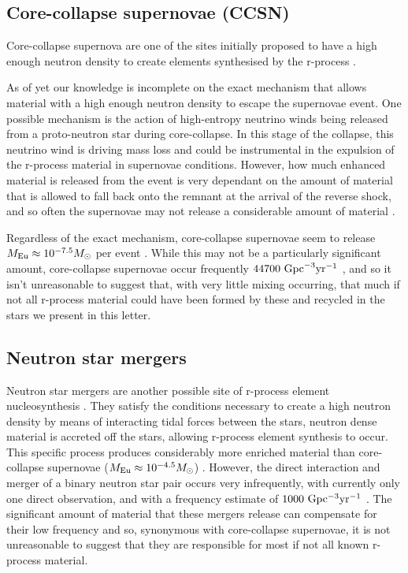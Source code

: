 \documentclass[a4paper,fleqn,usenatbib]{mnras}
\begin{document}
	\subsection{Core-collapse supernovae (CCSN)}
	Core-collapse supernova are one of the sites initially proposed to have a high enough neutron density to create elements synthesised by the r-process \citep{Burbidge1957}. 
	
	As of yet our knowledge is incomplete on the exact mechanism that allows material with a high enough neutron density to escape the supernovae event.
	One possible mechanism is the action of high-entropy neutrino winds being released from a proto-neutron star during core-collapse. In this stage of the collapse, this neutrino wind is driving mass loss and could be instrumental in the expulsion of the r-process material in supernovae conditions. However, how much enhanced material is released from the event is very dependant on the amount of material that is allowed to fall back onto the remnant at the arrival of the reverse shock, and so often the supernovae may not release a considerable amount of material \citep{Woosley1992, Burrows1995}. 
	
	Regardless of the exact mechanism, core-collapse supernovae seem to release $M_{\rm{Eu}}\approx10^{-7.5} M_{\odot}$ per event \citep{Argast2004} . While this may not be a particularly significant amount, core-collapse supernovae occur frequently $44700\ \rm{Gpc}^{-3} \rm{yr^{-1}}$ \citep{Li2011}, and so it isn't unreasonable to suggest that, with very little mixing occurring, that much if not all r-process material could have been formed by these and recycled in the stars we present in this letter.
	
	\subsection{Neutron star mergers}
	\label{NSmerg}
	Neutron star mergers are another possible site of r-process element nucleosynthesis \citep{Kasen2017,Hotok2013,Drout2017}. They satisfy the conditions necessary to create a high neutron density by means of interacting tidal forces between the stars, neutron dense material is accreted off the stars, allowing r-process element synthesis to occur. This specific process produces considerably more enriched material than core-collapse supernovae ($M_{\rm{Eu}}\approx10^{-4.5} M_{\odot}$) \citep{Goriely2011}. However, the direct interaction and merger of a binary neutron star pair occurs very infrequently, with currently only one direct observation, and with a frequency estimate of $1000\ \rm{Gpc^{-3}yr^{-1}}$ \citep{LIGO2016}. The significant amount of material that these mergers release can compensate for their low frequency and so, synonymous with core-collapse supernovae, it is not unreasonable to suggest that they are responsible for most if not all known r-process material. 
\end{document}
